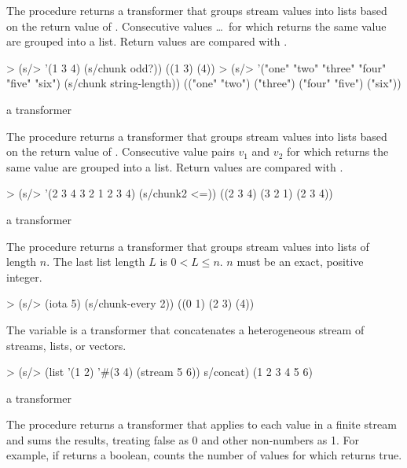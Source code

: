 The  procedure returns a transformer that groups stream values into lists
based on the return value of . Consecutive values  \ldots\ for which
 returns the same value are grouped into a list. Return values are
compared with .

\codebegin
> (s/> '(1 3 4) (s/chunk odd?))
((1 3) (4))
> (s/> '("one" "two" "three" "four" "five" "six") (s/chunk string-length))
(("one" "two") ("three") ("four" "five") ("six"))
\codeend

\begin{procedure}
\end{procedure}
\returns{} a transformer

The  procedure returns a transformer that groups stream values into lists
based on the return value of . Consecutive value pairs $v_1$ and $v_2$ for
which  returns the same value are grouped into a
list. Return values are compared with .

\codebegin
> (s/> '(2 3 4 3 2 1 2 3 4) (s/chunk2 <=))
((2 3 4) (3 2 1) (2 3 4))
\codeend

\begin{procedure}
\end{procedure}
\returns{} a transformer

The  procedure returns a transformer that groups stream values into
lists of length $n$. The last list length $L$ is $0 < L \le n$. $n$ must be an exact,
positive integer.

\codebegin
> (s/> (iota 5) (s/chunk-every 2))
((0 1) (2 3) (4))
\codeend

\begin{variable}
\end{variable}
\antipar

The  variable is a transformer that concatenates a heterogeneous stream of
streams, lists, or vectors.

\codebegin
> (s/> (list '(1 2) '#(3 4) (stream 5 6)) s/concat)
(1 2 3 4 5 6)
\codeend

\begin{procedure}
\end{procedure}
\returns{} a transformer

The  procedure returns a transformer that applies  to each
value in a finite stream and sums the results, treating false as 0 and other non-numbers
as 1. For example, if  returns a boolean,  counts the number
of values for which  returns true.

